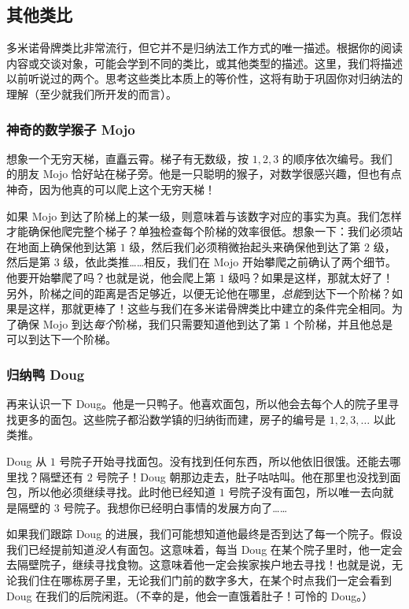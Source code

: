 \subsection{其他类比}

多米诺骨牌类比非常流行，但它并不是归纳法工作方式的唯一描述。根据你的阅读内容或交谈对象，可能会学到不同的类比，或其他类型的描述。这里，我们将描述以前听说过的两个。思考这些类比本质上的等价性，这将有助于巩固你对归纳法的理解（至少就我们所开发的而言）。

\subsubsection*{神奇的数学猴子 Mojo}

想象一个无穷天梯，直矗云霄。梯子有无数级，按 $1, 2, 3$ 的顺序依次编号。我们的朋友 Mojo 恰好站在梯子旁。他是一只聪明的猴子，对数学很感兴趣，但也有点神奇，因为他真的可以爬上这个无穷天梯！

如果 Mojo 到达了阶梯上的某一级，则意味着与该数字对应的事实为真。我们怎样才能确保他爬完整个梯子？单独检查每个阶梯的效率很低。想象一下：我们必须站在地面上确保他到达第 $1$ 级，然后我们必须稍微抬起头来确保他到达了第 $2$ 级，然后是第 $3$ 级，依此类推……相反，我们在 Mojo 开始攀爬之前确认了两个细节。他要开始攀爬了吗？也就是说，他会爬上第 $1$ 级吗？如果是这样，那就太好了！另外，阶梯之间的距离是否足够近，以便无论他在哪里，\emph{总能}到达下一个阶梯？如果是这样，那就更棒了！这些与我们在多米诺骨牌类比中建立的条件完全相同。为了确保 Mojo 到达\emph{每个}阶梯，我们只需要知道他到达了第 $1$ 个阶梯，并且他总是可以到达下一个阶梯。

\subsubsection*{归纳鸭 Doug}

再来认识一下 Doug。他是一只鸭子。他喜欢面包，所以他会去每个人的院子里寻找更多的面包。这些院子都沿数学镇的归纳街而建，房子的编号是 $1, 2, 3, \dots$ 以此类推。

Doug 从 $1$ 号院子开始寻找面包。没有找到任何东西，所以他依旧很饿。还能去哪里找？隔壁还有 $2$ 号院子！Doug 朝那边走去，肚子咕咕叫。他在那里也没找到面包，所以他必须继续寻找。此时他已经知道 $1$ 号院子没有面包，所以唯一去向就是隔壁的 $3$ 号院子。我想你已经明白事情的发展方向了…… 

如果我们跟踪 Doug 的进展，我们可能想知道他最终是否到达了每一个院子。假设我们已经提前知道\emph{没人}有面包。这意味着，每当 Doug 在某个院子里时，他一定会去隔壁院子，继续寻找食物。这意味着他一定会挨家挨户地去寻找！也就是说，无论我们住在哪栋房子里，无论我们门前的数字多大，在某个时点我们一定会看到 Doug 在我们的后院闲逛。（不幸的是，他会一直饿着肚子！可怜的 Doug。）
